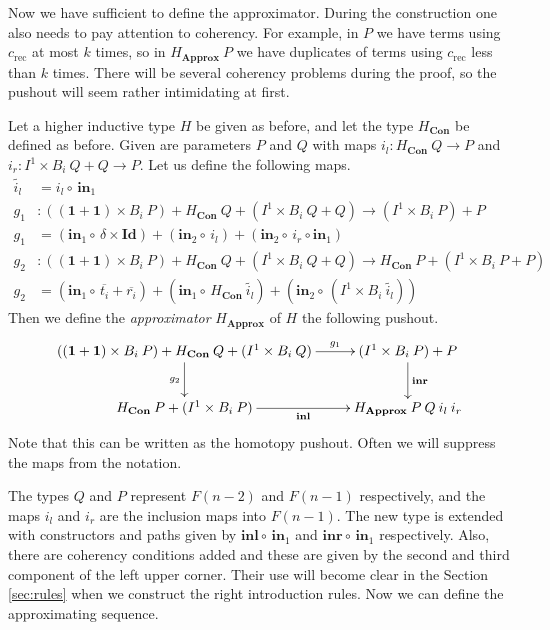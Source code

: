 \documentclass[a4paper,UKenglish]{lipics-v2016}
\newcommand{\Boperator}[1]{\mathrm{\mathbf{#1}}}
\newcommand{\inn}{\Boperator{in}}
\newcommand{\comp}[0]{\circ \,}
\newcommand{\one}[0]{\textbf{1}}
\newcommand{\rec}[0]{\operatorname{rec}}
\newcommand{\Con}[0]{\textbf{Con}}
\newcommand{\Approx}[0]{\textbf{Approx}}
\newcommand{\idmap}[0]{\Boperator{Id}}
\newcommand{\inl}[0]{\Boperator{inl}}
\newcommand{\inr}[0]{\Boperator{inr}}
\begin{document}
Now we have sufficient to define the approximator.
During the construction one also needs to pay attention to coherency.
For example, in $P$ we have terms using $c_{\rec}$ at most $k$ times, so in $H_{\Approx} \> P$ we have duplicates of terms using $c_{\rec}$ less than $k$ times.
There will be several coherency problems during the proof, so the pushout will seem rather intimidating at first.

\begin{definition}
Let a higher inductive type $H$ be given as before, and let the type $H_{\Con}$ be defined as before.
Given are parameters $P$ and $Q$ with maps $i_l : H_{\Con} \> Q \rightarrow P$ and $i_r : I^1 \times B_i \> Q + Q \rightarrow P$.
Let us define the following maps.
\begin{align*}
\widetilde{i_l} &= i_l \comp \inn_1\\
g_1 &: ((\one + \one) \times B_i \> P) + H_{\Con} \> Q  + (I^1 \times B_i \> Q + Q)\rightarrow (I^1 \times B_i \> P) + P\\
g_1 &= (\inn_1 \comp \delta \times \idmap) + (\inn_2 \comp i_l) + (\inn_2 \comp i_r \circ \inn_1)\\
g_2 &: ((\one + \one) \times B_i \> P) + H_{\Con} \> Q + (I^1 \times B_i \> Q + Q) \rightarrow H_{\Con} \> P + (I^1 \times B_i \> P + P)\\
g_2 &= (\inn_1 \comp \overline{t_i} + \overline{r_i})+ (\inn_1 \comp H_{\Con} \> \widetilde{i_l}) + (\inn_2 \comp (I^1 \times B_i \> \widetilde{i_l}))
\end{align*}
Then we define the \emph{approximator} $H_{\Approx}$ of $H$ the following pushout.
\[
\xymatrix
{
	((\one + \one) \times B_i \> P) + H_{\Con} \> Q + (I^1 \times B_i \> Q) 
	\ar[d]_{g_2} 
	\ar[r]^-{g_1}
	& (I^1 \times B_i \> P) + P  
	\ar[d]^-{\inr}\\
	H_{\Con} \> P + (I^1 \times B_i \> P)  
	\ar[r]_-{\inl} 
	& H_{\Approx} \> P \> Q \> i_l \> i_r
}
\]
Note that this can be written as the homotopy pushout.
Often we will suppress the maps from the notation.
\end{definition}

The types $Q$ and $P$ represent $F(n-2)$ and $F(n-1)$ respectively, and the maps $i_l$ and $i_r$ are the inclusion maps into $F(n-1)$.
The new type is extended with constructors and paths given by $\inl \comp \inn_1$ and $\inr \comp \inn_1$ respectively.
Also, there are coherency conditions added and these are given by the second and third component of the left upper corner.
Their use will become clear in the Section \ref{sec:rules} when we construct the right introduction rules.
Now we can define the approximating sequence.
\end{document}

